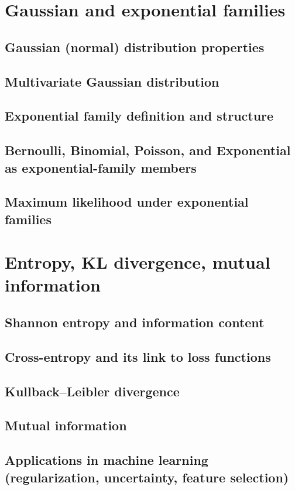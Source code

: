 \section{Gaussian and exponential families}
\subsection{Gaussian (normal) distribution properties}
\subsection{Multivariate Gaussian distribution}
\subsection{Exponential family definition and structure}
\subsection{Bernoulli, Binomial, Poisson, and Exponential as exponential-family members}
\subsection{Maximum likelihood under exponential families}

\section{Entropy, KL divergence, mutual information}
\subsection{Shannon entropy and information content}
\subsection{Cross-entropy and its link to loss functions}
\subsection{Kullback–Leibler divergence}
\subsection{Mutual information}
\subsection{Applications in machine learning (regularization, uncertainty, feature selection)}

